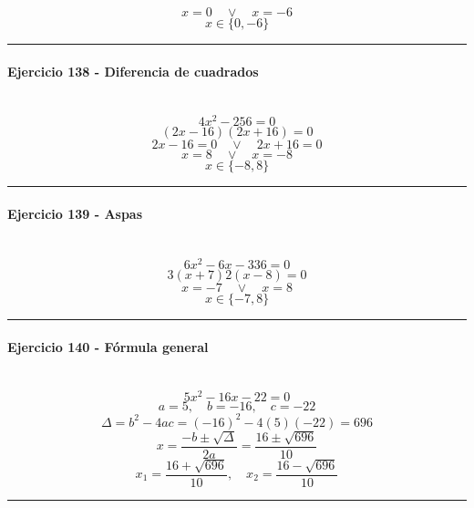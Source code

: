 \documentclass[10pt,a4paper]{article}
\newcommand{\res}[1]{\paragraph{#1}\mbox{}\\[-1.2em]}
\begin{document}
\[ x=0 \quad \vee \quad x=-6 \]
\[ \boxed{x\in\{0,-6\}} \]
\vspace{1mm}\hrule\vspace{2mm}
\res{Ejercicio 138 - Diferencia de cuadrados}
\[ 4 x^{2} - 256=0 \]
\[ (2x-16)(2x+16)=0 \]
\[ 2x-16=0 \quad \vee \quad 2x+16=0 \]
\[ x=8 \quad \vee \quad x=-8 \]
\[ \boxed{x\in\{-8,8\}} \]
\vspace{1mm}\hrule\vspace{2mm}
\res{Ejercicio 139 - Aspas}
\[ 6 x^{2} - 6 x - 336=0 \]
\[ 3(x+7)2(x-8)=0 \]
\[ x=-7 \quad \vee \quad x=8 \]
\[ \boxed{x\in\{-7,8\}} \]
\vspace{1mm}\hrule\vspace{2mm}
\res{Ejercicio 140 - Fórmula general}
\[ 5 x^{2} - 16 x - 22=0 \]
\[ a=5,\quad b=-16,\quad c=-22 \]
\[ \Delta=b^2-4ac=(-16)^2-4(5)(-22)=696 \]
\[ x=\frac{-b\pm\sqrt{\Delta}}{2a}=\frac{16\pm\sqrt{696}}{10} \]
\[ \boxed{x_1=\frac{16+\sqrt{696}}{10},\quad x_2=\frac{16-\sqrt{696}}{10}} \]
\vspace{1mm}\hrule\vspace{2mm}
\end{document}
